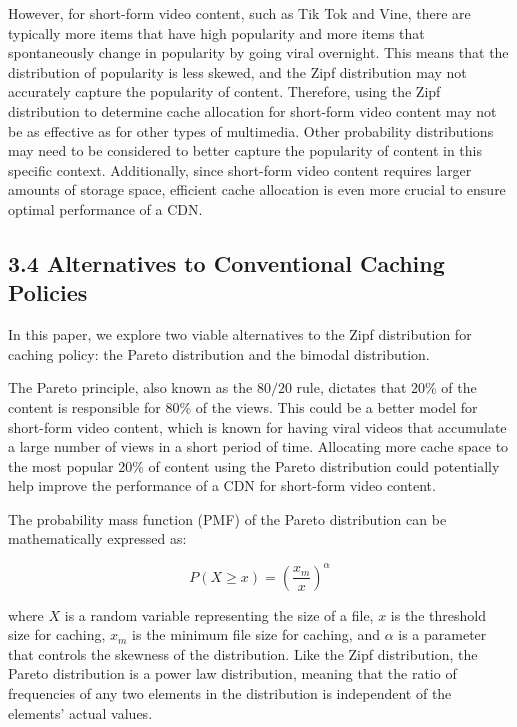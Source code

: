 \documentclass[
	a4paper, %
	10pt, %
	unnumberedsections, %
	twoside, %
]{LTJournalArticle}
\begin{document}
However, for short-form video content, such as Tik Tok and Vine, there are typically more items that have high popularity and more items that spontaneously change in popularity by going viral overnight. This means that the distribution of popularity is less skewed, and the Zipf distribution may not accurately capture the popularity of content. Therefore, using the Zipf distribution to determine cache allocation for short-form video content may not be as effective as for other types of multimedia. Other probability distributions may need to be considered to better capture the popularity of content in this specific context. Additionally, since short-form video content requires larger amounts of storage space, efficient cache allocation is even more crucial to ensure optimal performance of a CDN.

\subsection{3.4 Alternatives to Conventional Caching Policies}

In this paper, we explore two viable alternatives to the Zipf distribution for caching policy: the Pareto distribution and the bimodal distribution.

The Pareto principle, also known as the $80/20$ rule, dictates that 20\% of the content is responsible for 80\% of the views. This could be a better model for short-form video content, which is known for having viral videos that accumulate a large number of views in a short period of time. Allocating more cache space to the most popular 20\% of content using the Pareto distribution could potentially help improve the performance of a CDN for short-form video content.

The probability mass function (PMF) of the Pareto distribution can be mathematically expressed as:

\[
    P(X \geq x) = \left(\frac{x_m}{x}\right)^\alpha
\]

where $X$ is a random variable representing the size of a file, $x$ is the threshold size for caching, $x_m$ is the minimum file size for caching, and $\alpha$ is a parameter that controls the skewness of the distribution. Like the Zipf distribution, the Pareto distribution is a power law distribution, meaning that the ratio of frequencies of any two elements in the distribution is independent of the elements' actual values.  
\end{document}
